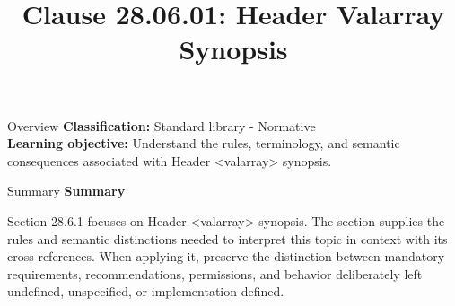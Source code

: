 \documentclass[10pt,letterpaper]{article}
\title{Clause 28.06.01: Header Valarray Synopsis}
\author{}
\date{}
\begin{document}
\maketitle
\begin{CornellOverviewBox}{Overview}
\textbf{Classification:} Standard library - Normative\\[2pt]
\textbf{Learning objective:} Understand the rules, terminology, and semantic consequences associated with Header <valarray> synopsis.
\end{CornellOverviewBox}\begin{CornellSummaryBox}{Summary}
{\sffamily\bfseries\color{Accent} Summary}\par\vspace{3pt}Section 28.6.1 focuses on Header <valarray> synopsis. The section supplies the rules and semantic distinctions needed to interpret this topic in context with its cross-references. When applying it, preserve the distinction between mandatory requirements, recommendations, permissions, and behavior deliberately left undefined, unspecified, or implementation-defined.
\end{CornellSummaryBox}
\end{document}
